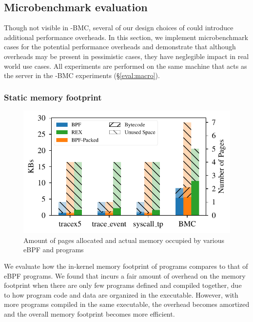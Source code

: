 \subsection{Microbenchmark evaluation}
Though not visible in \projname{}-BMC, several of our design choices of
    \projname{} could introduce additional performance overheads.
In this section, we implement microbenchmark cases for the potential
    performance overheads and demonstrate that although overheads may be
    present in pessimistic cases, they have neglegible impact in real world use
    cases.
All experiments are performed on the same machine that acts as the server in
    the \projname{}-BMC experiments (\S\ref{eval:macro}).

\subsubsection{Static memory footprint}
\label{eval:mem-footprint}
\begin{figure}[t]
    \includegraphics[width=1.0\linewidth]{figs/mem.pdf}
    \centering
    \vspace{-25pt}
    \caption{Amount of pages allocated and actual memory occupied by various
        eBPF and \projname{} programs}
    \label{fig:eval-mem-footprint}
    \vspace{-10pt}
\end{figure}
We evaluate how the in-kernel memory footprint of \projname{} programs
    compares to that of eBPF programs.
We found that \projname{} incurs a fair amount of overhead on the memory
    footprint when there are only few programs defined and compiled together,
    due to how program code and data are organized in the executable.
However, with more programs compiled in the same executable, the overhead
    becomes amortized and the overall memory footprint becomes more efficient.

